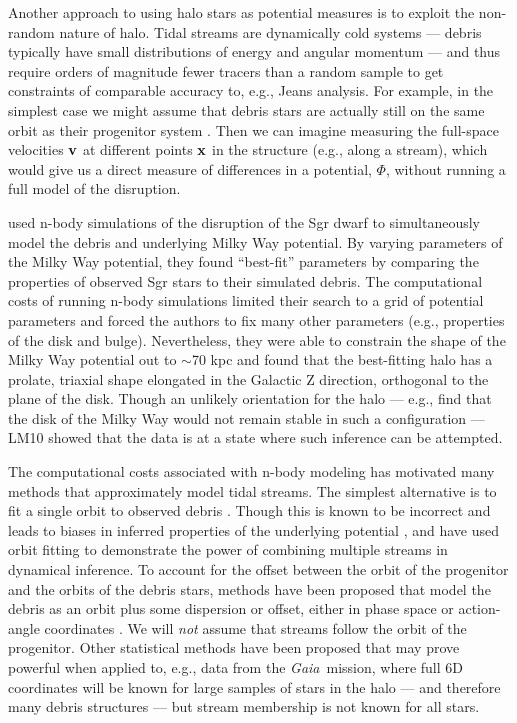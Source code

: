 \documentclass[letterpaper,12pt,preprint]{aastex}
\newcommand{\project}[1]{\textsl{#1}}
\newcommand{\gaia}{\project{Gaia}}
\begin{document}
Another approach to using halo stars as potential measures is to exploit the non-random nature of halo. Tidal streams are dynamically cold systems --- debris typically have small distributions of energy and angular momentum --- and thus require orders of magnitude fewer tracers than a random sample to get constraints of comparable accuracy to, e.g., Jeans analysis. For example, in the simplest case we might assume that debris stars are actually still on the same orbit as their progenitor system \citep[a \emph{wrong} assumption, see e.g.,][]{eyre11}. Then we can imagine measuring the full-space velocities ${\bf v}$ at different points ${\bf x}$ in the structure (e.g., along a stream), which would give us a direct measure of differences in a potential, $\Phi$, without running a full model of the disruption.

\citet[][LM10]{law10} used n-body simulations of the disruption of the Sgr dwarf to simultaneously model the debris and underlying Milky Way potential. By varying parameters of the Milky Way potential, they found ``best-fit'' parameters by comparing the properties of observed Sgr stars to their simulated debris. The computational costs of running n-body simulations limited their search to a grid of potential parameters and forced the authors to fix many other parameters (e.g., properties of the disk and bulge). Nevertheless, they were able to constrain the shape of the Milky Way potential out to $\sim$70 kpc and found that the best-fitting halo has a prolate, triaxial shape elongated in the Galactic Z direction, orthogonal to the plane of the disk. Though an unlikely orientation for the halo --- e.g., \cite{debattista13} find that the disk of the Milky Way would not remain stable in such a configuration --- LM10 showed that the data is at a state where such inference can be attempted. 

The computational costs associated with n-body modeling has motivated many methods that approximately model tidal streams. The simplest alternative is to fit a single orbit to observed debris \citep[e.g.,][]{koposov10, deg13}. Though this is known to be incorrect and leads to biases in inferred properties of the underlying potential \citep[e.g.,][]{eyre11, lux13, sanders13a}, \cite{deg14} and \cite{lux13} have used orbit fitting to demonstrate the power of combining multiple streams in dynamical inference. To account for the offset between the orbit of the progenitor and the orbits of the debris stars, methods have been proposed that model the debris as an orbit plus some dispersion or offset, either in phase space \citep[e.g.,][]{eyre09a, varghese11, kuepper12} or action-angle coordinates \citep{eyre11, sanders13b, bovy14, sanders14}. We will \emph{not} assume that streams follow the orbit of the progenitor. Other statistical methods have been proposed \citep[][]{penarrubia12, johnston99a, sanderson14} that may prove powerful when applied to, e.g., data from the \gaia\, mission, where full 6D coordinates will be known for large samples of stars in the halo --- and therefore many debris structures --- but stream membership is not known for all stars.
\end{document}
